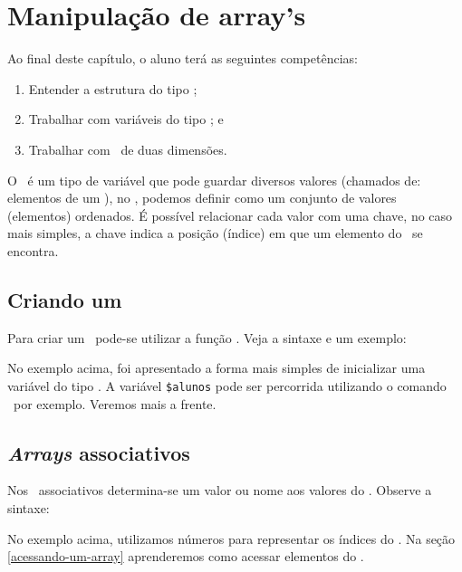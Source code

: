 \chapter{Manipulação de array's}
\label{manipulacao-de-arrays}

Ao final deste capítulo, o aluno terá as seguintes competências:
\begin{enumerate}
    \item Entender a estrutura do tipo \tipoarray;  
    \item Trabalhar com variáveis do tipo \tipoarray; e
    \item Trabalhar com \tipoarrays~de duas dimensões.
\end{enumerate}

O \tipoarray~é um tipo de variável que pode guardar diversos valores (chamados de: elementos 
de um \tipoarray), no \php, podemos definir como um conjunto de valores (elementos) ordenados. 
É possível relacionar cada valor com uma chave, no caso mais simples, a chave indica a 
posição (índice) em que um elemento do \tipoarray~se encontra.

\section{Criando um \comandoarray}
\label{criando-um-array}

Para criar um \tipoarray~pode-se utilizar a função \comandoarray. Veja a sintaxe e um exemplo:



No exemplo acima, foi apresentado a forma mais simples de inicializar uma variável do 
tipo \tipoarray. A variável \texttt{\$alunos} pode ser percorrida utilizando o comando
\comandofor~por exemplo. Veremos mais a frente.

\section{\textit{Arrays} associativos}
\label{arrays-associativos}

Nos \tipoarrays~associativos determina-se um valor ou nome aos valores do \tipoarray.
Observe a sintaxe:



No exemplo acima, utilizamos números para representar os índices do \tipoarray. 
Na seção \ref{acessando-um-array} aprenderemos como acessar elementos do \tipoarray.

